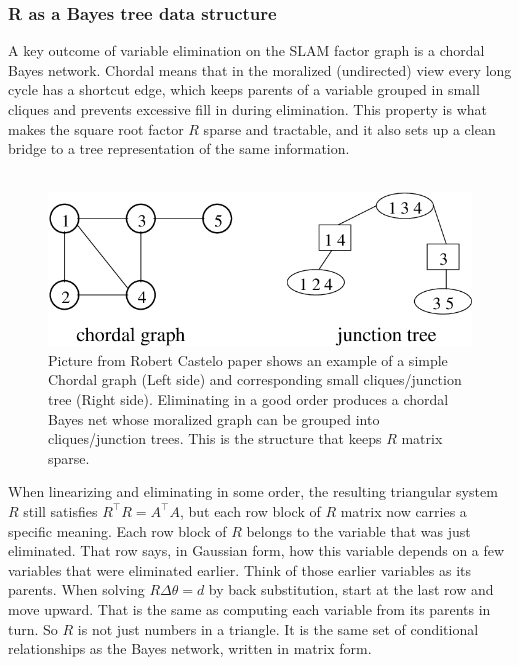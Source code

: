 \subsubsection{R as a Bayes tree data structure}
A key outcome of variable elimination on the SLAM factor graph is a chordal Bayes network. Chordal means that in the moralized (undirected) view every long cycle has a shortcut edge, which keeps parents of a variable grouped in small cliques and prevents excessive fill in during elimination. This property is what makes the square root factor $R$ sparse and tractable, and it also sets up a clean bridge to a tree representation of the same information. \cite{iSAM2_paper,Bayes_tree_for_SLAM_paper}
\\ \\
\begin{figure}[H]
    \centering
    \includegraphics[width=0.98\linewidth]{Pictures/Optimizers/iSAM2/chodar_graph_to_junction_tree_example.png}
    \caption{Picture from Robert Castelo paper \cite{chordal_graph_to_junction_tree_paper} shows an example of a simple Chordal graph (Left side) and corresponding small cliques/junction tree (Right side). Eliminating in a good order produces a chordal Bayes net whose moralized graph can be grouped into cliques/junction trees. This is the structure that keeps $R$ matrix sparse.}
    \label{fig:optimizer-iSAM2-chordal}
\end{figure}
\noindent
When linearizing and eliminating in some order, the resulting triangular system $R$ still satisfies $R^\top R = A^\top A$, but each row block of $R$ matrix now carries a specific meaning. Each row block of $R$ belongs to the variable that was just eliminated. That row says, in Gaussian form, how this variable depends on a few variables that were eliminated earlier. Think of those earlier variables as its parents. When solving $R\Delta\theta=d$ by back substitution, start at the last row and move upward. That is the same as computing each variable from its parents in turn. So $R$ is not just numbers in a triangle. It is the same set of conditional relationships as the Bayes network, written in matrix form.
